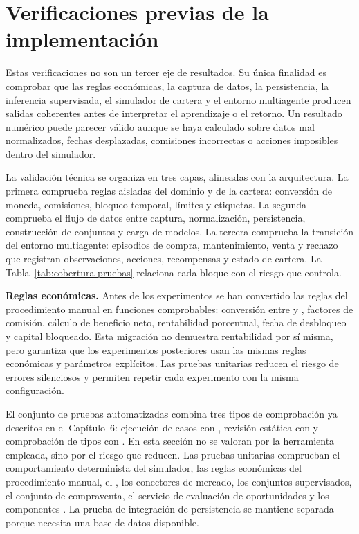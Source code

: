 \section{Verificaciones previas de la implementación}
\label{sec:validacion-tecnica}

Estas verificaciones no son un tercer eje de resultados. Su única finalidad es comprobar que las reglas económicas, la captura de datos, la persistencia, la inferencia supervisada, el simulador de cartera y el entorno multiagente producen salidas coherentes antes de interpretar el aprendizaje o el retorno. Un resultado numérico puede parecer válido aunque se haya calculado sobre datos mal normalizados, fechas desplazadas, comisiones incorrectas o acciones imposibles dentro del simulador.

La validación técnica se organiza en tres capas, alineadas con la arquitectura. La primera comprueba reglas aisladas del dominio y de la cartera: conversión de moneda, comisiones, bloqueo temporal, límites y etiquetas. La segunda comprueba el flujo de datos entre captura, normalización, persistencia, construcción de conjuntos y carga de modelos. La tercera comprueba la transición del entorno multiagente: episodios de compra, mantenimiento, venta y rechazo que registran observaciones, acciones, recompensas y estado de cartera. La Tabla~\ref{tab:cobertura-pruebas} relaciona cada bloque con el riesgo que controla.

\textbf{Reglas económicas.} Antes de los experimentos se han convertido las reglas del procedimiento manual en funciones comprobables: conversión entre  y , factores de comisión, cálculo de beneficio neto, rentabilidad porcentual, fecha de desbloqueo y capital bloqueado. Esta migración no demuestra rentabilidad por sí misma, pero garantiza que los experimentos posteriores usan las mismas reglas económicas y parámetros explícitos. Las pruebas unitarias reducen el riesgo de errores silenciosos y permiten repetir cada experimento con la misma configuración.

El conjunto de pruebas automatizadas combina tres tipos de comprobación ya descritos en el Capítulo~6: ejecución de casos con , revisión estática con  y comprobación de tipos con . En esta sección no se valoran por la herramienta empleada, sino por el riesgo que reducen. Las pruebas unitarias comprueban el comportamiento determinista del simulador, las reglas económicas del procedimiento manual, el , los conectores de mercado, los conjuntos supervisados, el conjunto de compraventa, el servicio de evaluación de oportunidades y los componentes . La prueba de integración de persistencia se mantiene separada porque necesita una base de datos disponible.

